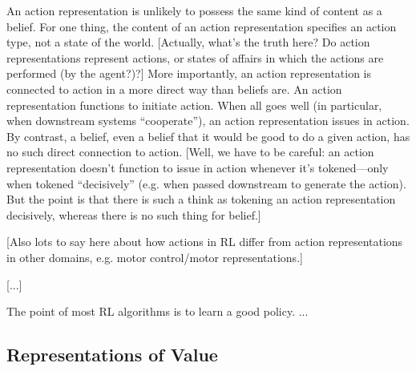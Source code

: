 An action representation is unlikely to possess the same kind of content as a belief.
For one thing, the content of an action representation specifies an action type, not a state of the world.
[Actually, what's the truth here? Do action representations represent actions, or states of affairs in which the actions are performed (by the agent?)?]
More importantly, an action representation is connected to action in a more direct way than beliefs are.
An action representation functions to initiate action.
When all goes well (in particular, when downstream systems ``cooperate''), an action representation issues in action.
By contrast, a belief, even a belief that it would be good to do a given action, has no such direct connection to action.
[Well, we have to be careful: an action representation doesn't function to issue in action whenever it's tokened---only when tokened ``decisively'' (e.g. when passed downstream to generate the action). But the point is that there is such a think as tokening an action representation decisively, whereas there is no such thing for belief.]

[Also lots to say here about how actions in RL differ from action representations in other domains, e.g. motor control/motor representations.]

[...]

The point of most RL algorithms is to learn a good policy.
...
\subsection{Representations of Value}
